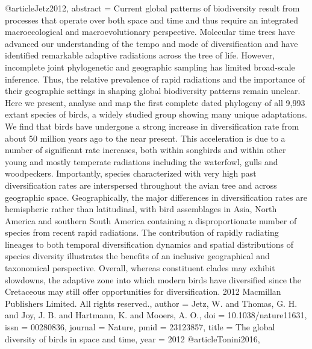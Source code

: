 {{{{{@article{Jetz2012,
abstract = {Current global patterns of biodiversity result from processes that operate over both space and time and thus require an integrated macroecological and macroevolutionary perspective. Molecular time trees have advanced our understanding of the tempo and mode of diversification and have identified remarkable adaptive radiations across the tree of life. However, incomplete joint phylogenetic and geographic sampling has limited broad-scale inference. Thus, the relative prevalence of rapid radiations and the importance of their geographic settings in shaping global biodiversity patterns remain unclear. Here we present, analyse and map the first complete dated phylogeny of all 9,993 extant species of birds, a widely studied group showing many unique adaptations. We find that birds have undergone a strong increase in diversification rate from about 50 million years ago to the near present. This acceleration is due to a number of significant rate increases, both within songbirds and within other young and mostly temperate radiations including the waterfowl, gulls and woodpeckers. Importantly, species characterized with very high past diversification rates are interspersed throughout the avian tree and across geographic space. Geographically, the major differences in diversification rates are hemispheric rather than latitudinal, with bird assemblages in Asia, North America and southern South America containing a disproportionate number of species from recent rapid radiations. The contribution of rapidly radiating lineages to both temporal diversification dynamics and spatial distributions of species diversity illustrates the benefits of an inclusive geographical and taxonomical perspective. Overall, whereas constituent clades may exhibit slowdowns, the adaptive zone into which modern birds have diversified since the Cretaceous may still offer opportunities for diversification. {\textcopyright} 2012 Macmillan Publishers Limited. All rights reserved.},
author = {Jetz, W. and Thomas, G. H. and Joy, J. B. and Hartmann, K. and Mooers, A. O.},
doi = {10.1038/nature11631},
issn = {00280836},
journal = {Nature},
pmid = {23123857},
title = {{The global diversity of birds in space and time}},
year = {2012}
}
@article{Tonini2016,
}}}}}}
